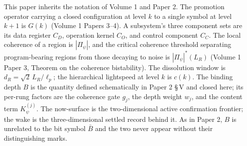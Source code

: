 \documentclass[11pt,oneside]{report}
\theoremstyle{definition}
\theoremstyle{remark}
\begin{document}
This paper inherits the notation of Volume 1 and Paper 2. The promotion
operator carrying a closed configuration at level \ensuremath{k} to a single
symbol at level \ensuremath{k+1} is \ensuremath{G(k)} (Volume 1 Papers 3--4).
A subsystem's three component sets are its data register \ensuremath{C_{D}},
operation kernel \ensuremath{C_{O}}, and control component \ensuremath{C_{C}}.
The local coherence of a region is \ensuremath{|\Pi_{\psi}|}, and the
critical coherence threshold separating program-bearing regions from those
decaying to noise is \ensuremath{|\Pi_{\psi}|^{*}(L_{R})} (Volume 1 Paper 3,
Theorem on the coherence bistability). The dissolution window is
\ensuremath{d_{R} = \sqrt{2}\,L_{R}/\ell_{p}}; the hierarchical lightspeed at
level \ensuremath{k} is \ensuremath{c(k)}. The binding depth \ensuremath{B} is
the quantity defined schematically in Paper 2 \S\,V and closed here; its
per-rung factors are the coherence gate \ensuremath{g_{j}}, the depth weight
\ensuremath{w_{j}}, and the content term \ensuremath{K_{\psi}^{(j)}}. The
now-surface is the two-dimensional active confirmation frontier; the wake is
the three-dimensional settled record behind it. As in Paper 2,
\ensuremath{B} is unrelated to the bit symbol \ensuremath{\bar{B}} and the
two never appear without their distinguishing marks.
\end{document}
